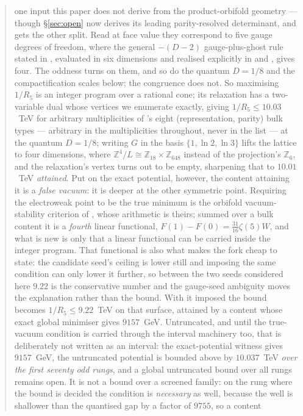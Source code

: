 \documentclass[11pt,a4paper]{article}
\newcommand{\ZZ}{\mathbb{Z}}
\begin{document}
\begin{abstract}
{one input this paper does not derive from the product-orbifold geometry --- though
\S\ref{sec:open} now derives its leading parity-resolved determinant, and gets the other split.}
Read at face value they correspond to five gauge degrees of
freedom, where the general $-(D-2)$ gauge-plus-ghost rule stated in \cite{HY04}, evaluated in six
dimensions and realised explicitly in \cite{HNT} and \cite{AHMN}, gives four.
The oddness turns on them, and so do the quantum $D=1/8$ and the compactification scales below;
the congruence does not. So maximising
$1/R_5$ is an integer program over a rational cone; its relaxation has a two-variable dual whose
vertices we enumerate exactly, giving $1/R_5 \le 10.03$~TeV for arbitrary multiplicities of
\cite{KM25}'s eight (representation, parity) bulk types --- arbitrary in the multiplicities
throughout, never in the list --- at the
quantum $D=1/8$; writing $G$ in the basis $\{1,\ln2,\ln3\}$ lifts the lattice to four dimensions,
where $\ZZ^4/L\cong\ZZ_{18}\times\ZZ_{648}$ instead of the projection's $\ZZ_6$, and the
relaxation's vertex turns out to be empty, sharpening that to $10.01$~TeV \emph{attained}. Put on the exact potential, however, the
content attaining it is a \emph{false vacuum}: it is deeper at the other symmetric point. Requiring
the electroweak point to be the true minimum is the orbifold vacuum-stability criterion of \cite{CCD24},
whose arithmetic is theirs; summed over a bulk content it is a \emph{fourth} linear functional,
$F(1)-F(0)=\tfrac{31}{16}\zeta(5)W$, and what is new is only that a linear functional can be
carried inside the integer program. That functional is also what makes the fork cheap to state: the candidate seed's ceiling is lower
still and imposing the same condition can only lower it further, so between the two seeds
considered here $9.22$ is the conservative number and the gauge-seed ambiguity moves the
explanation rather than the bound. With it imposed the bound becomes $1/R_5 \le 9.22$~TeV on that
surface, attained by a content whose exact global minimiser gives $9157$~GeV. Untruncated, and
until the true-vacuum condition is carried through the interval machinery too, that is deliberately
not written as an interval: the exact-potential witness gives $9157$~GeV, the untruncated potential
is bounded above by $10.037$~TeV \emph{over the first seventy odd rungs}, and a global untruncated
bound over all rungs remains open. It is not a bound over
a screened family: on the rung where the bound is decided the condition is \emph{necessary} as
well, because the well is shallower than the quantised gap by a factor of $9755$, so a content

\end{abstract}
\end{document}
